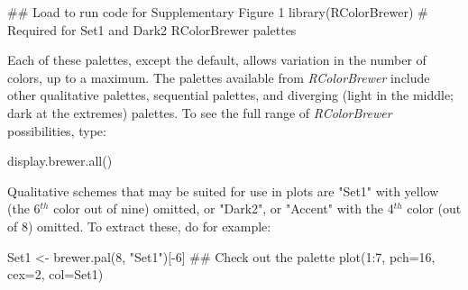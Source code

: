 \begin{fullwidth}
\begin{Schunk}
\begin{Sinput}
## Load to run code for Supplementary Figure 1
library(RColorBrewer)   # Required for Set1 and Dark2 RColorBrewer palettes
\end{Sinput}
\end{Schunk}

\begin{Schunk}
\begin{Sinput}
colpal <- rev(list(
    "Default palette" = palette()[1:8],  cm.colors = cm.colors(12),
    terrain.colors = terrain.colors(12), heat.colors = heat.colors(12),
    blueRamp = colorRampPalette(c(blues9, "white"))(12),
    "Brewer-Set1" = brewer.pal(8, "Set1"),
    "Brewer-Dark2" = brewer.pal(8, "Dark2")))
palnam <- names(colpal)
plot(1, 1, xlim=c(0.5,12.5), ylim=c(0,length(palnam)+0.5), type="n",
     axes=FALSE, xlab="", ylab="")
for(i in 1:length(palnam)){
    len <- length(colpal[[i]])
    points(1:len, rep(i,len), pch=15, col=colpal[[i]], cex=5.5)
    legend(1, i+0.025, palnam[i], adj=0, box.col="white", bg="white",
           x.intersp=0, y.intersp=0, yjust=0)
\end{Sinput}
\end{Schunk}
\end{fullwidth}
Each of these palettes, except the default, allows variation in the
number of colors, up to a maximum.  The palettes available from {\em
  RColorBrewer} include other qualitative palettes, sequential
palettes, and diverging (light in the middle; dark at the extremes)
palettes.  To see the full range of {\em RColorBrewer} possibilities,
type: 
\begin{Schunk}
\begin{Sinput}
display.brewer.all()
\end{Sinput}
\end{Schunk}
\noindent
{}  Qualitative schemes that may be
suited for use in plots are "Set1" with yellow (the 6$^{th}$ color out
of nine) omitted, or "Dark2", or "Accent" with the 4$^{th}$ color
(out of 8) omitted.  To extract these, do for example:
\begin{Schunk}
\begin{Sinput}
Set1 <- brewer.pal(8, "Set1")[-6]
## Check out the palette
plot(1:7, pch=16, cex=2, col=Set1)
\end{Sinput}
\end{Schunk}

